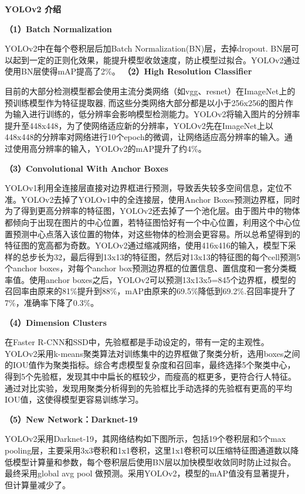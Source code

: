 \begin{figure}
\centering
\caption{}
\end{figure}

\textbf{YOLOv2 介绍}

\textbf{（1）Batch Normalization}

YOLOv2中在每个卷积层后加Batch Normalization(BN)层，去掉dropout.
BN层可以起到一定的正则化效果，能提升模型收敛速度，防止模型过拟合。YOLOv2通过使用BN层使得mAP提高了2\%。
\textbf{（2）High Resolution Classifier}

目前的大部分检测模型都会使用主流分类网络（如vgg、resnet）在ImageNet上的预训练模型作为特征提取器,
而这些分类网络大部分都是以小于256x256的图片作为输入进行训练的，低分辨率会影响模型检测能力。YOLOv2将输入图片的分辨率提升至448x448，为了使网络适应新的分辨率，YOLOv2先在ImageNet上以448x448的分辨率对网络进行10个epoch的微调，让网络适应高分辨率的输入。通过使用高分辨率的输入，YOLOv2的mAP提升了约4\%。

\textbf{（3）Convolutional With Anchor Boxes}

YOLOv1利用全连接层直接对边界框进行预测，导致丢失较多空间信息，定位不准。YOLOv2去掉了YOLOv1中的全连接层，使用Anchor
Boxes预测边界框，同时为了得到更高分辨率的特征图，YOLOv2还去掉了一个池化层。由于图片中的物体都倾向于出现在图片的中心位置，若特征图恰好有一个中心位置，利用这个中心位置预测中心点落入该位置的物体，对这些物体的检测会更容易。所以总希望得到的特征图的宽高都为奇数。YOLOv2通过缩减网络，使用416x416的输入，模型下采样的总步长为32，最后得到13x13的特征图，然后对13x13的特征图的每个cell预测5个anchor
boxes，对每个anchor
box预测边界框的位置信息、置信度和一套分类概率值。使用anchor
boxes之后，YOLOv2可以预测13x13x5=845个边界框，模型的召回率由原来的81\%提升到88\%，mAP由原来的69.5\%降低到69.2\%.召回率提升了7\%，准确率下降了0.3\%。

\textbf{（4）Dimension Clusters}

在Faster
R-CNN和SSD中，先验框都是手动设定的，带有一定的主观性。YOLOv2采用k-means聚类算法对训练集中的边界框做了聚类分析，选用boxes之间的IOU值作为聚类指标。综合考虑模型复杂度和召回率，最终选择5个聚类中心，得到5个先验框，发现其中中扁长的框较少，而瘦高的框更多，更符合行人特征。通过对比实验，发现用聚类分析得到的先验框比手动选择的先验框有更高的平均IOU值，这使得模型更容易训练学习。

\textbf{（5）New Network：Darknet-19}

YOLOv2采用Darknet-19，其网络结构如下图所示，包括19个卷积层和5个max
pooling层，主要采用3x3卷积和1x1卷积，这里1x1卷积可以压缩特征图通道数以降低模型计算量和参数，每个卷积层后使用BN层以加快模型收敛同时防止过拟合。最终采用global
avg pool 做预测。采用YOLOv2，模型的mAP值没有显著提升，但计算量减少了。

